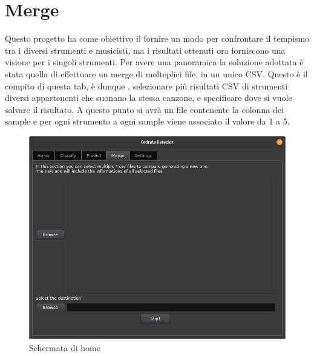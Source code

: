 \section{Merge}
Questo progetto ha come obiettivo il fornire un modo per confrontare il tempismo tra i diversi strumenti e musicisti, ma i risultati ottenuti ora forniscono una visione per i singoli strumenti. Per avere una panoramica la soluzione adottata è stata quella di effettuare un merge di molteplici file, in un unico CSV. Questo è il compito di questa tab, è dunque , selezionare più risultati CSV di strumenti diversi appartenenti che suonano la stessa canzone, e specificare dove si vuole salvare il risultato. A questo punto si avrà un file contenente la colonna dei sample e per ogni strumento a ogni sample viene associato il valore da 1 a 5.
\begin{figure}[h!]
	\begin{center}
		\includegraphics[scale=0.5]{./immagini/gui/merge.png}
	\end{center}
	\caption{Schermata di home}\label{fig:gui-merge}
\end{figure}


